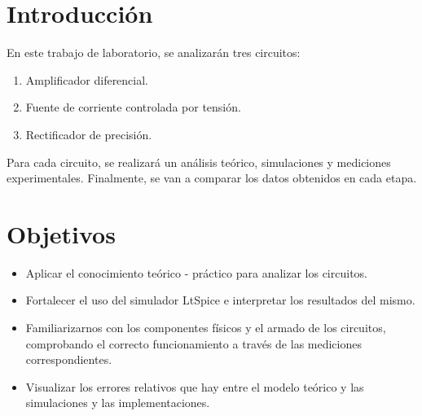 \newpage
\section{Introducción}
En este trabajo de laboratorio, se analizarán tres circuitos: 
\begin{enumerate}
	\item Amplificador diferencial.
	\item Fuente de corriente controlada por tensión.
	\item Rectificador de precisión.
\end{enumerate}
Para cada circuito, se realizará un análisis teórico, simulaciones y mediciones experimentales. Finalmente, se van a comparar los datos obtenidos en cada etapa.

\section{Objetivos}
\begin{itemize}
	\item Aplicar el conocimiento teórico - práctico para analizar los circuitos.
	\item Fortalecer el uso del simulador LtSpice e interpretar los resultados del mismo.
	\item Familiarizarnos con los componentes físicos y el armado de los circuitos, comprobando el correcto funcionamiento a través de las mediciones correspondientes.
	\item Visualizar los errores relativos que hay entre el modelo teórico y las simulaciones y las implementaciones.
	
\end{itemize}
